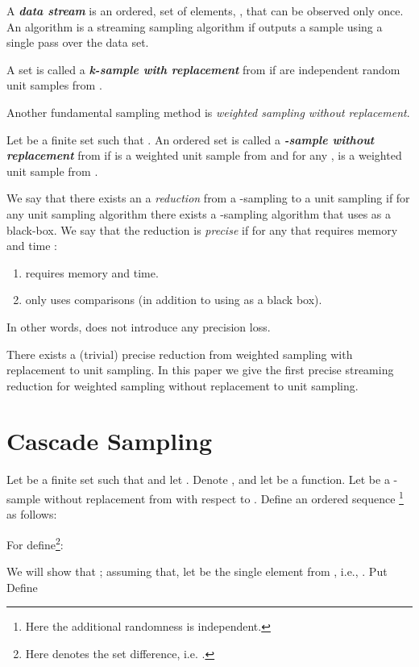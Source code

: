 \documentclass{llncs}
\begin{document}
\begin{definition}
A \emph{\textbf{data stream}}  is an ordered, set of
elements, , that can be observed only
once. An algorithm  is a streaming sampling algorithm if  outputs a sample using a single pass over the data set.
\end{definition}
\begin{definition}
A set  is
called a \emph{\textbf{k-sample with replacement}} from  if  are independent random unit samples from .
\end{definition}

Another fundamental sampling method is \emph{weighted sampling without replacement}.
\begin{definition}
Let  be a finite set such that .
An ordered set  is called a \emph{\textbf{-sample without replacement}} from 
if  is a weighted unit sample from  and for any ,  is a weighted unit sample from .
\end{definition}
\begin{definition}
We say that there exists an a \emph{reduction} from a -sampling to a unit sampling if for
any unit sampling algorithm 
there exists a -sampling algorithm  that uses  as a black-box.
We say that the reduction is \emph{precise} if for any  that requires memory  and time :
\begin{enumerate}
\item  requires  memory and  time.
\item  only uses comparisons (in addition to using  as a black box).
\end{enumerate}
In other words,  does not introduce any precision loss.
\end{definition}
There exists a (trivial) precise reduction from weighted sampling with replacement to unit sampling.
In this paper we give the first precise streaming reduction for weighted sampling without replacement to unit sampling.


\section{Cascade Sampling}
Let  be a finite set such that  and let . Denote , and let  be a function.
Let  be a -sample without replacement from  with respect to .
Define an ordered sequence \footnote{Here the additional randomness is independent.} as follows:

For  define\footnote{Here  denotes the set difference, i.e. .}:

We will show that ; assuming that, let  be the single element from , i.e., .
Put  Define
\end{document}
